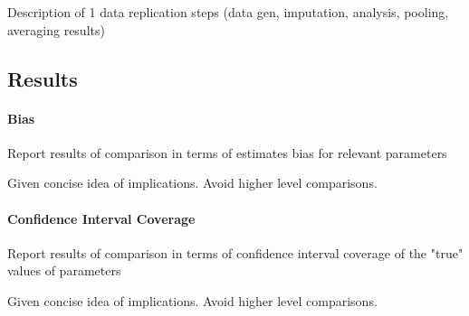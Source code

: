 	Description of 1 data replication steps (data gen, imputation, analysis, pooling, averaging results)

\subsection{Results}

\paragraph{Bias}
	Report results of comparison in terms of estimates bias for relevant parameters

	Given concise idea of implications. Avoid higher level comparisons.
	
\paragraph{Confidence Interval Coverage}
	Report results of comparison in terms of confidence interval coverage of the "true" values of parameters 

	Given concise idea of implications. Avoid higher level comparisons.
	

